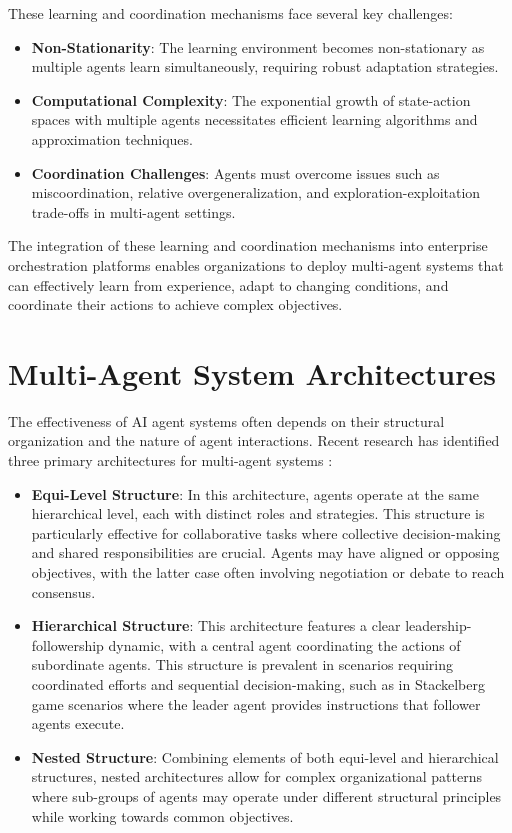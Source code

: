 \documentclass[conference]{IEEEtran}
\begin{document}
These learning and coordination mechanisms face several key challenges:

\begin{itemize}
\item \textbf{Non-Stationarity}: The learning environment becomes non-stationary as multiple agents learn simultaneously, requiring robust adaptation strategies.
\item \textbf{Computational Complexity}: The exponential growth of state-action spaces with multiple agents necessitates efficient learning algorithms and approximation techniques.
\item \textbf{Coordination Challenges}: Agents must overcome issues such as miscoordination, relative overgeneralization, and exploration-exploitation trade-offs in multi-agent settings.
\end{itemize}

The integration of these learning and coordination mechanisms into enterprise orchestration platforms enables organizations to deploy multi-agent systems that can effectively learn from experience, adapt to changing conditions, and coordinate their actions to achieve complex objectives.

\section{Multi-Agent System Architectures}
The effectiveness of AI agent systems often depends on their structural organization and the nature of agent interactions. Recent research has identified three primary architectures for multi-agent systems \cite{han2024multiagent}:

\begin{itemize}
\item \textbf{Equi-Level Structure}: In this architecture, agents operate at the same hierarchical level, each with distinct roles and strategies. This structure is particularly effective for collaborative tasks where collective decision-making and shared responsibilities are crucial. Agents may have aligned or opposing objectives, with the latter case often involving negotiation or debate to reach consensus.
\item \textbf{Hierarchical Structure}: This architecture features a clear leadership-followership dynamic, with a central agent coordinating the actions of subordinate agents. This structure is prevalent in scenarios requiring coordinated efforts and sequential decision-making, such as in Stackelberg game scenarios where the leader agent provides instructions that follower agents execute.
\item \textbf{Nested Structure}: Combining elements of both equi-level and hierarchical structures, nested architectures allow for complex organizational patterns where sub-groups of agents may operate under different structural principles while working towards common objectives.
\end{itemize}
\end{document}
